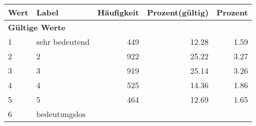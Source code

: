      \begin{longtable}{lXrrr}
     \toprule
     \textbf{Wert} & \textbf{Label} & \textbf{Häufigkeit} & \textbf{Prozent(gültig)} & \textbf{Prozent} \\
     \endhead
     \midrule
     \multicolumn{5}{l}{\textbf{Gültige Werte}}\\

     1 &
     \multicolumn{1}{X}{ sehr bedeutend   } &


       \num{449} &
       \num[round-mode=places,round-precision=2]{12,28} &
         \num[round-mode=places,round-precision=2]{1,59} \\

     2 &
     \multicolumn{1}{X}{ 2   } &


       \num{922} &
       \num[round-mode=places,round-precision=2]{25,22} &
         \num[round-mode=places,round-precision=2]{3,27} \\

     3 &
     \multicolumn{1}{X}{ 3   } &


       \num{919} &
       \num[round-mode=places,round-precision=2]{25,14} &
         \num[round-mode=places,round-precision=2]{3,26} \\

     4 &
     \multicolumn{1}{X}{ 4   } &


       \num{525} &
       \num[round-mode=places,round-precision=2]{14,36} &
         \num[round-mode=places,round-precision=2]{1,86} \\

     5 &
     \multicolumn{1}{X}{ 5   } &


       \num{464} &
       \num[round-mode=places,round-precision=2]{12,69} &
         \num[round-mode=places,round-precision=2]{1,65} \\

     6 &
     \multicolumn{1}{X}{ bedeutungslos   } &



\end{longtable}
